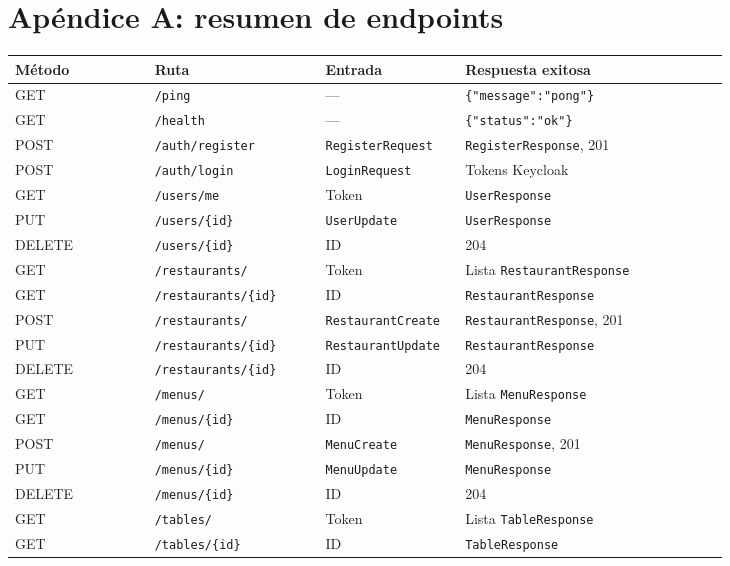 \documentclass[12pt,letterpaper]{article}
\def\codefile#1{\nolinkurl{#1}}
\begin{document}
\section{Apéndice A: resumen de endpoints}

\small
\begin{longtable}{p{0.18\linewidth}p{0.22\linewidth}p{0.18\linewidth}p{0.34\linewidth}}
\toprule
\textbf{Método} & \textbf{Ruta} & \textbf{Entrada} & \textbf{Respuesta exitosa}\\
\midrule
GET & \codefile{/ping} & --- & \codefile{\{"message":"pong"\}}\\
GET & \codefile{/health} & --- & \codefile{\{"status":"ok"\}}\\
POST & \codefile{/auth/register} & \codefile{RegisterRequest} & \codefile{RegisterResponse}, 201\\
POST & \codefile{/auth/login} & \codefile{LoginRequest} & Tokens Keycloak\\
GET & \codefile{/users/me} & Token & \codefile{UserResponse}\\
PUT & \codefile{/users/{id}} & \codefile{UserUpdate} & \codefile{UserResponse}\\
DELETE & \codefile{/users/{id}} & ID & 204\\
GET & \codefile{/restaurants/} & Token & Lista \codefile{RestaurantResponse}\\
GET & \codefile{/restaurants/{id}} & ID & \codefile{RestaurantResponse}\\
POST & \codefile{/restaurants/} & \codefile{RestaurantCreate} & \codefile{RestaurantResponse}, 201\\
PUT & \codefile{/restaurants/{id}} & \codefile{RestaurantUpdate} & \codefile{RestaurantResponse}\\
DELETE & \codefile{/restaurants/{id}} & ID & 204\\
GET & \codefile{/menus/} & Token & Lista \codefile{MenuResponse}\\
GET & \codefile{/menus/{id}} & ID & \codefile{MenuResponse}\\
POST & \codefile{/menus/} & \codefile{MenuCreate} & \codefile{MenuResponse}, 201\\
PUT & \codefile{/menus/{id}} & \codefile{MenuUpdate} & \codefile{MenuResponse}\\
DELETE & \codefile{/menus/{id}} & ID & 204\\
GET & \codefile{/tables/} & Token & Lista \codefile{TableResponse}\\
GET & \codefile{/tables/{id}} & ID & \codefile{TableResponse}\\

\end{longtable}
\end{document}

